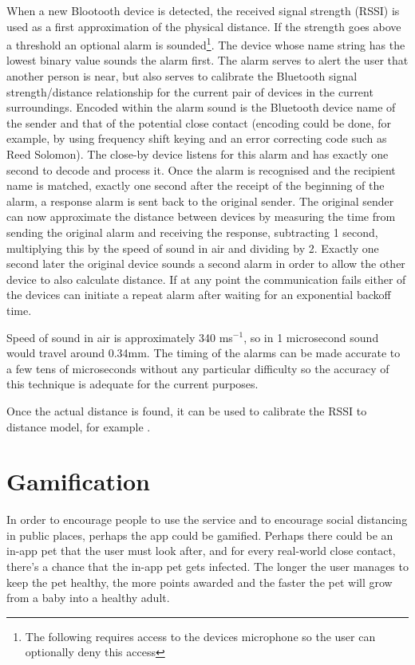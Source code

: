 \documentclass{article}
\begin{document}
When a new Blootooth device is detected, the received signal strength (RSSI) is used as a first approximation of the physical distance. If the strength goes above a threshold an optional alarm is sounded\footnote{The following requires access to the devices microphone so the user can optionally deny this access}. The device whose name string has the lowest binary value sounds the alarm first. The alarm serves to alert the user that another person is near, but also serves to calibrate the Bluetooth signal strength/distance relationship for the current pair of devices in the current surroundings. Encoded within the alarm sound is the Bluetooth device name of the sender and that of the potential close contact (encoding could be done, for example, by using frequency shift keying and an error correcting code such as Reed Solomon). The close-by device listens for this alarm and has exactly one second to decode and process it. Once the alarm is recognised and the recipient name is matched, exactly one second after the receipt of the beginning of the alarm, a response alarm is sent back to the original sender. The original sender can now approximate the distance between devices by measuring the time from sending the original alarm and receiving the response, subtracting 1 second, multiplying this by the speed of sound in air and dividing by 2. Exactly one second later the original device sounds a second alarm in order to allow the other device to also calculate distance. If at any point the communication fails either of the devices can initiate a repeat alarm after waiting for an exponential backoff time.

Speed of sound in air is approximately 340 ms$^{-1}$, so in 1 microsecond sound would travel around 0.34mm. The timing of the alarms can be made accurate to a few tens of microseconds without any particular difficulty so the accuracy of this technique is adequate for the current purposes.

Once the actual distance is found, it can be used to calibrate the RSSI to distance model, for example \cite{zhou2006position}.

\section{Gamification}

In order to encourage people to use the service and to encourage social distancing in public places, perhaps the app could be gamified. Perhaps there could be an in-app pet that the user must look after, and for every real-world close contact, there's a chance that the in-app pet gets infected. The longer the user manages to keep the pet healthy, the more points awarded and the faster the pet will grow from a baby into a healthy adult.
\end{document}
